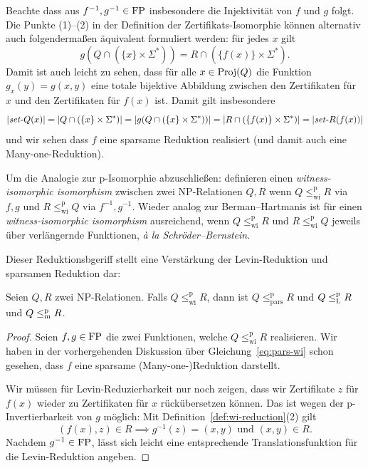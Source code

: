 Beachte dass aus $f^{-1},g^{-1}\in\mathrm{FP}$ insbesondere die Injektivität von $f$ und $g$ folgt.
Die Punkte (1)--(2) in der Definition der Zertifikats-Isomorphie können alternativ auch folgendermaßen äquivalent formuliert werden:  für jedes $x$ gilt
\begin{equation}\label{eq:pars-wi} g(Q\cap(\{x\}\times\Sigma^*))  = R \cap (\{f(x)\}\times\Sigma^*).  \end{equation}
Damit ist auch leicht zu sehen, dass für alle $x\in\operatorname{Proj}(Q)$ die Funktion $g_x(y)= g(x,y)$ eine totale bijektive Abbildung zwischen den Zertifikaten für $x$ und den Zertifikaten für $f(x)$ ist. 
Damit gilt insbesondere
\[ |\mathit{set}\text{-}{}Q(x)|=|Q\cap(\{x\}\times\Sigma^*)|=|g(Q\cap(\{x\}\times\Sigma^*))|=|R \cap (\{f(x)\}\times\Sigma^*)|=|\mathit{set}\text{-}{}R(f(x))| \]
und wir sehen dass $f$ eine sparsame Reduktion realisiert (und damit auch eine Many-one-Reduktion).

Um die Analogie zur p-Isomorphie abzuschließen: \citeauthor{wiedermann_witness-isomorphic_1995} definieren einen \emph{witness-isomorphic isomorphism} zwischen zwei NP-Relationen $Q, R$ wenn $Q\leq_\mathrm{wi}^\mathrm p R$ via $f,g$ und $R\leq_\mathrm{wi}^\mathrm p Q$ via $f^{-1}, g^{-1}$. Wieder analog zur Berman--Hartmanis ist für einen \emph{witness-isomorphic isomorphism} ausreichend, wenn $Q\leq_\mathrm{wi}^\mathrm p R$ und $R\leq_\mathrm{wi}^\mathrm p Q$ jeweils über verlängernde Funktionen, \emph{à la Schröder--Bernstein}.

Dieser Reduktionsbgeriff stellt eine Verstärkung der Levin-Reduktion und sparsamen Reduktion dar:
\begin{lemma}\label{lemma:wi-reduction}
    Seien $Q, R$ zwei NP-Relationen. Falls $Q\leq_\mathrm{wi}^\mathrm p R$, dann ist $Q\leq_\mathrm{pars}^\mathrm p R$ und $Q\leq_\mathrm{L}^\mathrm{p} R$ und $Q\leq_\mathrm{m}^\mathrm{p} R$.
\end{lemma}
\begin{proof}
    Seien $f,g\in \mathrm{FP}$ die zwei Funktionen, welche $Q\leq_\mathrm{wi}^\mathrm p R$ realisieren.
    Wir haben in der vorhergehenden Diskussion über Gleichung~\ref{eq:pars-wi} schon gesehen, dass $f$ eine sparsame (Many-one-)Reduktion darstellt.

    Wir müssen für Levin-Reduzierbarkeit nur noch zeigen, dass wir Zertifikate $z$ für $f(x)$ wieder zu Zertifikaten für $x$ rückübersetzen können. Das ist wegen der p-Invertierbarkeit von $g$ möglich:
    Mit Definition~\ref{def:wi-reduction}(2) gilt
    \[ (f(x), z) \in R \implies g^{-1}(z)=(x,y) \text{ und } (x,y)\in R. \]
    Nachdem $g^{-1}\in\mathrm{FP}$, lässt sich leicht eine entsprechende Translationsfunktion für die Levin-Reduktion angeben.
\end{proof}

